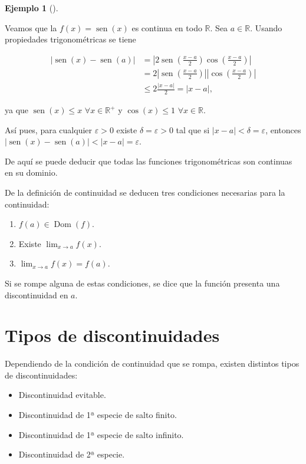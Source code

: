\documentclass[
  a4paper,
]{scrreport}
\providecommand{\tightlist}{%
  \setlength{\itemsep}{0pt}\setlength{\parskip}{0pt}}\usepackage{longtable,booktabs,array}
\theoremstyle{definition}
\newtheorem{example}{Ejemplo}[chapter]
\theoremstyle{plain}
\theoremstyle{definition}
\theoremstyle{definition}
\theoremstyle{plain}
\theoremstyle{plain}
\theoremstyle{remark}
\begin{document}
\begin{example}[]\protect\hypertarget{exm-continuidad-seno}{}\label{exm-continuidad-seno}

Veamos que la \(f(x)=\operatorname{sen}(x)\) es continua en todo
\(\mathbb{R}\). Sea \(a\in\mathbb{R}\). Usando propiedades
trigonométricas se tiene

\begin{align*}
|\operatorname{sen}(x)-\operatorname{sen}(a)|
&=|2\operatorname{sen}\left(\frac{x-a}{2}\right)\cos\left(\frac{x-a}{2}\right)| \\
&= 2|\operatorname{sen}\left(\frac{x-a}{2}\right)||\cos\left(\frac{x-a}{2}\right)| \\
&\leq 2\frac{|x-a|}{2}=|x-a|,
\end{align*}

ya que \(\operatorname{sen}(x)\leq x\) \(\forall x\in\mathbb{R}^+\) y
\(\cos(x)\leq 1\) \(\forall x\in\mathbb{R}\).

Así pues, para cualquier \(\varepsilon>0\) existe
\(\delta=\varepsilon>0\) tal que si \(|x-a|<\delta=\varepsilon\),
entonces
\(|\operatorname{sen}(x)-\operatorname{sen}(a)|<|x-a|=\varepsilon\).

De aquí se puede deducir que todas las funciones trigonométricas son
continuas en su dominio.

\end{example}

De la definición de continuidad se deducen tres condiciones necesarias
para la continuidad:

\begin{enumerate}
\def\labelenumi{\arabic{enumi}.}
\tightlist
\item
  \(f(a)\in \operatorname{Dom}(f)\).
\item
  Existe \(\lim_{x\to a}f(x)\).
\item
  \(\lim_{x\to a}f(x)=f(a)\).
\end{enumerate}

Si se rompe alguna de estas condiciones, se dice que la función presenta
una discontinuidad en \(a\).

\section{Tipos de discontinuidades}\label{tipos-de-discontinuidades}

Dependiendo de la condición de continuidad que se rompa, existen
distintos tipos de discontinuidades:

\begin{itemize}
\tightlist
\item
  Discontinuidad evitable.
\item
  Discontinuidad de 1ª especie de salto finito.
\item
  Discontinuidad de 1ª especie de salto infinito.
\item
  Discontinuidad de 2ª especie.
\end{itemize}
\end{document}
